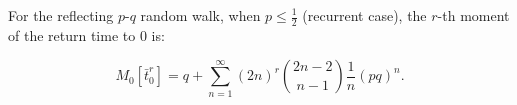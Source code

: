 For the reflecting $p$-$q$ random walk, when $p \leq \frac{1}{2}$ (recurrent case), the $r$-th moment of the return time to $0$ is:

$$M_0[\bar{t}_0^r] = q + \sum_{n=1}^{\infty} (2n)^r \binom{2n-2}{n-1} \frac{1}{n} (pq)^n.$$
